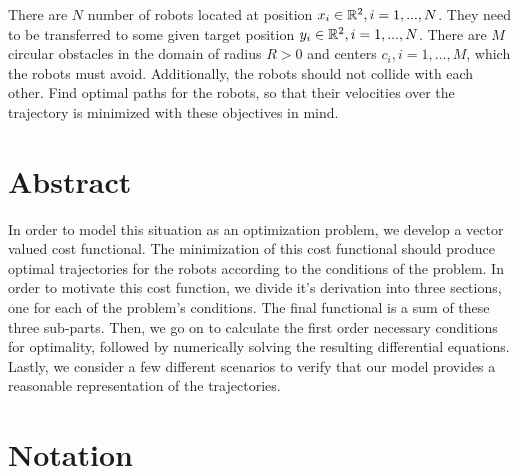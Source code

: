 
There are  \( N \)  number of robots located at position \( x_i \in \mathbb{R}^{2} , i = 1, ..., N \). They need to be transferred to some given target position \( y_i \in \mathbb{R}^2 , i = 1, ..., N \). There are \( M \) circular obstacles in the domain of radius \( R > 0 \) and centers \( c_i, i = 1, ..., M \), which the robots must avoid. Additionally, the robots should not collide with each other. Find optimal paths for the robots, so that their velocities over the trajectory is minimized with these objectives in mind.

\section*{Abstract}

In order to model this situation as an optimization problem, we develop a vector valued cost functional. The minimization of this cost functional should produce optimal trajectories for the robots according to the conditions of the problem. In order to motivate this cost function, we divide it’s derivation into three sections, one for each of the problem’s conditions. The final functional is a sum of these three sub-parts. Then, we go on to calculate the first order necessary conditions for optimality, followed by numerically solving the resulting differential equations. Lastly, we consider a few different scenarios to verify that our model provides a reasonable representation of the trajectories. 

\section*{Notation}

